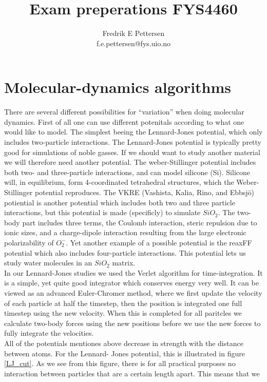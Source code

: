 \documentclass[a4paper,english, 10pt, twoside]{article}
\title{Exam preperations FYS4460}
\author{Fredrik E Pettersen\\ f.e.pettersen@fys.uio.no}
\begin{document}
\maketitle
\newpage
\tableofcontents
\newpage

\section{Molecular-dynamics algorithms}
There are several different possibilities for ``variation'' when doing molecular dynamics. First of all 
one can use different potenitals according to what one would like to model. The simplest beeing the 
Lennard-Jones potential, which only includes two-particle interactions. The Lennard-Jones potential is 
typically pretty good for simulations of noble gasses. If we should want to study another material we will 
therefore need another potential. The weber-Stillinger potential includes both two- and three-particle 
interactions, and can model silicone (Si). Silicone will, in equilibrium, form 4-coordinated tetrahedral 
structures, which the Weber-Stillinger potential reproduces. The VKRE (Vashista, Kalia, Rino, and Ebbsjö) 
potiential is another potential which includes both two and three particle interactions, but this potential 
is made (specificly) to simulate $SiO_2$. The two-body part includes three terms, the Coulomb interaction, 
steric repulsion due to ionic sizes, and a charge-dipole interaction resulting from the large
electronic polarizability of $O_2^-$. Yet another example of a possible potential is the reaxFF potential 
which also includes four-particle interactions. This potential lets us study water molecules in an $SiO_2$ 
matrix.\\
In our Lennard-Jones studies we used the Verlet algorithm for time-integration. It is a simple, yet quite 
good integrator which conserves energy very well. It can be viewed as an advanced Euler-Chromer method, 
where we first update the velocity of each particle at half the timestep, then the position is integrated 
one full timestep using the new velocity. When this is completed for all paritcles we calculate two-body 
forces using the new positions before we use the new forces to fully integrate the velocities.\\
All of the potentials mentiones above decrease in strength with the distance between atoms. For the Lennard-
Jones potential, this is illustrated in figure \ref{LJ_cut}. As we see from this figure, there is for all 
practical purposes no interaction between particles that are a certain length apart. This means that we 
\end{document}
